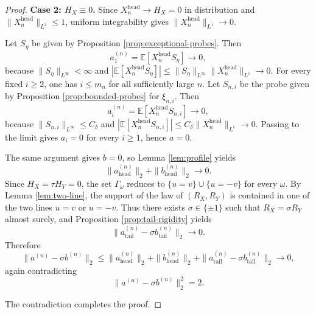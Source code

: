 \documentclass[11pt]{amsart}
\newcommand{\E}{\mathbb E}
\begin{document}
\begin{proof}
\medskip
\noindent
\textbf{Case 2: $H_X \equiv 0$.}
Since $X_n^{\mathrm{head}} \to H_X = 0$ in distribution and
$\|X_n^{\mathrm{head}}\|_{L^2} \le 1$, uniform integrability gives
$\|X_n^{\mathrm{head}}\|_{L^1} \to 0$.

Let $S_\eta$ be given by Proposition \ref{prop:exceptional-probes}. Then
\[
a_1^{(n)}
=
\E[X_n^{\mathrm{head}} S_\eta]
\longrightarrow 0,
\]
because $\|S_\eta\|_{L^\infty} < \infty$ and
$|\E[X_n^{\mathrm{head}} S_\eta]| \le \|S_\eta\|_{L^\infty}
\|X_n^{\mathrm{head}}\|_{L^1} \to 0$.
For every fixed $i \ge 2$, one has $i \le m_n$ for all sufficiently large $n$.
Let $S_{n,i}$ be the probe given by Proposition \ref{prop:bounded-probes} for
$\xi_{n,i}$. Then
\[
a_i^{(n)}
=
\E[X_n^{\mathrm{head}} S_{n,i}]
\longrightarrow 0,
\]
because $\|S_{n,i}\|_{L^\infty} \le C_\delta$ and
$|\E[X_n^{\mathrm{head}} S_{n,i}]| \le C_\delta
\|X_n^{\mathrm{head}}\|_{L^1} \to 0$. Passing to
the limit gives $a_i=0$ for every $i \ge 1$, hence $a=0$.

The same argument gives $b=0$, so Lemma \ref{lem:profile} yields
\[
\|a^{(n)}_{\mathrm{head}}\|_2 + \|b^{(n)}_{\mathrm{head}}\|_2 \longrightarrow 0.
\]
Since $H_X = \tau H_Y = 0$, the set $\Gamma_\omega$ reduces to
$\{u=v\} \cup \{u=-v\}$ for every $\omega$. By Lemma \ref{lem:two-line}, the
support of the law of $(R_X,R_Y)$ is contained in one of the two lines $u=v$
or $u=-v$. Thus there exists $\sigma \in \{\pm 1\}$ such that
$R_X=\sigma R_Y$ almost surely, and Proposition
\ref{prop:tail-rigidity} yields
\[
\|a^{(n)}_{\mathrm{tail}} - \sigma b^{(n)}_{\mathrm{tail}}\|_2 \longrightarrow 0.
\]
Therefore
\[
\|a^{(n)}-\sigma b^{(n)}\|_2
\le
\|a^{(n)}_{\mathrm{head}}\|_2
+
\|b^{(n)}_{\mathrm{head}}\|_2
+
\|a^{(n)}_{\mathrm{tail}}-\sigma b^{(n)}_{\mathrm{tail}}\|_2
\longrightarrow 0,
\]
again contradicting
\[
\|a^{(n)}-\sigma b^{(n)}\|_2^2 = 2.
\]

The contradiction completes the proof.
\end{proof}



\end{document}

